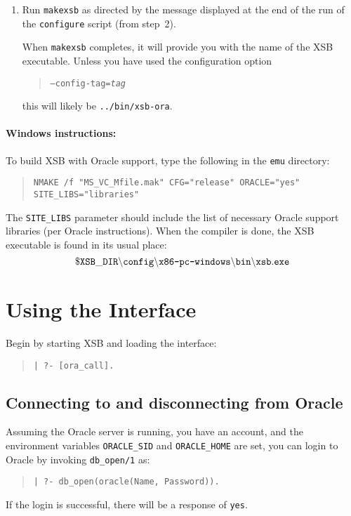 \begin{enumerate}
\textbf{Note: this file may provide insight into the library paths and
linking options required by your Oracle installation.}

\item Run {\tt makexsb} as directed by the message displayed at the
end of the run of the \texttt{configure} script (from step~2).

When {\tt makexsb} completes, it will provide you with the name of the
XSB executable.  Unless you have used the configuration option
\begin{quote}
	{\tt --config-tag=\emph{tag}}
\end{quote}
this will likely be {\tt ../bin/xsb-ora}.

\end{enumerate}

\paragraph{Windows instructions:}
To build XSB with Oracle support, type the following in the {\tt emu}
directory: 
\begin{quote}
 {\tt NMAKE /f "MS\_VC\_Mfile.mak" CFG="release" ORACLE="yes" SITE\_LIBS="libraries"  }
\end{quote}
The {\tt SITE\_LIBS} parameter should include the list of necessary Oracle
support libraries (per Oracle instructions). When the compiler is done, the 
XSB executable is found in its usual place:
\[
 \tt
 \$XSB\_DIR\backslash config\backslash \mbox{\tt x86-pc-windows}\backslash bin
 \backslash xsb.exe
\]


\section{Using the Interface} \label{oracle:use}

Begin by  starting XSB and loading the interface:
\begin{quote}
	\texttt{| ?- [ora\_call].}
\end{quote}

\subsection{Connecting to and disconnecting from Oracle}

Assuming the Oracle server is running, you have an account, and the
environment variables \texttt{ORACLE\_SID} and \texttt{ORACLE\_HOME}
are set, you can login to Oracle by invoking {\tt db\_open/1} as:
\begin{quote}
{\tt  | ?- db\_open(oracle(Name, Password)).}
\end{quote}
If the login is successful, there will be a response of {\tt yes}.


